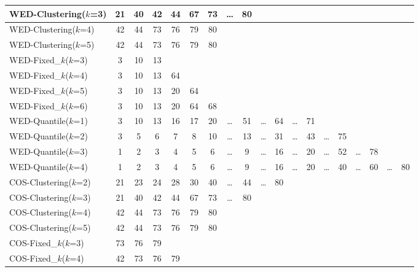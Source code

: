 \begin{table*}[ht]
{\begin{tabular}{|l|c|c|c|c|c|c|c|c|c|c|c|c|c|c|c|c|c|c|}
      WED-Clustering($k$=3) & 21 & 40 & 42 & 44 & 67 & 73 & \dots & 80 & ~ & ~ & ~ & ~ & ~ & ~ & ~ & ~ & ~ & ~ \\ \hline
      WED-Clustering($k$=4) & 42 & 44 & 73 & 76 & 79 & 80 & ~ & ~ & ~ & ~ & ~ & ~ & ~ & ~ & ~ & ~ & ~ & ~ \\ \hline
      WED-Clustering($k$=5) & 42 & 44 & 73 & 76 & 79 & 80 & ~ & ~ & ~ & ~ & ~ & ~ & ~ & ~ & ~ & ~ & ~ & ~ \\ \hline
      WED-Fixed\_$k$($k$=3) & 3 & 10 & 13 & ~ & ~ & ~ & ~ & ~ & ~ & ~ & ~ & ~ & ~ & ~ & ~ & ~ & ~ & ~ \\ \hline
      WED-Fixed\_$k$($k$=4) & 3 & 10 & 13 & 64 & ~ & ~ & ~ & ~ & ~ & ~ & ~ & ~ & ~ & ~ & ~ & ~ & ~ & ~ \\ \hline
      WED-Fixed\_$k$($k$=5) & 3 & 10 & 13 & 20 & 64 & ~ & ~ & ~ & ~ & ~ & ~ & ~ & ~ & ~ & ~ & ~ & ~ & ~ \\ \hline
      WED-Fixed\_$k$($k$=6) & 3 & 10 & 13 & 20 & 64 & 68 & ~ & ~ & ~ & ~ & ~ & ~ & ~ & ~ & ~ & ~ & ~ & ~ \\ \hline
      WED-Quantile($k$=1) & 3 & 10 & 13 & 16 & 17 & 20 & \dots & 51 & \dots & 64 & \dots & 71 & ~ & ~ & ~ & ~ & ~ & ~ \\ \hline
      WED-Quantile($k$=2) & 3 & 5 & 6 & 7 & 8 & 10 & \dots & 13 & \dots & 31 & \dots & 43 & \dots & 75 & ~ & ~ & ~ & ~ \\ \hline
      WED-Quantile($k$=3) & 1 & 2 & 3 & 4 & 5 & 6 & \dots & 9 & \dots & 16 & \dots & 20 & \dots & 52 & \dots & 78 & ~ & ~ \\ \hline
      WED-Quantile($k$=4) & 1 & 2 & 3 & 4 & 5 & 6 & \dots & 9 & \dots & 16 & \dots & 20 & \dots & 40 & \dots & 60 & \dots & 80 \\ \hline
      COS-Clustering($k$=2) & 21 & 23 & 24 & 28 & 30 & 40 & \dots & 44 & \dots & 80 & ~ & ~ & ~ & ~ & ~ & ~ & ~ & ~ \\ \hline
      COS-Clustering($k$=3) & 21 & 40 & 42 & 44 & 67 & 73 & \dots & 80 & ~ & ~ & ~ & ~ & ~ & ~ & ~ & ~ & ~ & ~ \\ \hline
      COS-Clustering($k$=4) & 42 & 44 & 73 & 76 & 79 & 80 & ~ & ~ & ~ & ~ & ~ & ~ & ~ & ~ & ~ & ~ & ~ & ~ \\ \hline
      COS-Clustering($k$=5) & 42 & 44 & 73 & 76 & 79 & 80 & ~ & ~ & ~ & ~ & ~ & ~ & ~ & ~ & ~ & ~ & ~ & ~ \\ \hline
      COS-Fixed\_$k$($k$=3) & 73 & 76 & 79 & ~ & ~ & ~ & ~ & ~ & ~ & ~ & ~ & ~ & ~ & ~ & ~ & ~ & ~ & ~ \\ \hline
      COS-Fixed\_$k$($k$=4) & 42 & 73 & 76 & 79 & ~ & ~ & ~ & ~ & ~ & ~ & ~ & ~ & ~ & ~ & ~ & ~ & ~ & ~ \\ \hline

\end{tabular}}
\end{table*}
